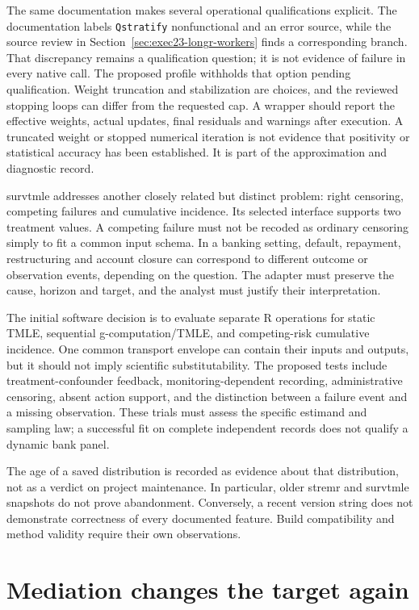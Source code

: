 The same documentation makes several operational qualifications explicit.
The documentation labels \texttt{Qstratify} nonfunctional and an error source,
while the source review in Section~\ref{sec:exec23-longr-workers} finds a
corresponding branch. That discrepancy remains a qualification question;
it is not evidence of failure in every native call. The proposed profile
withholds that option pending qualification. Weight truncation and stabilization
are choices, and the reviewed stopping loops can differ from the requested
cap. A wrapper should report the effective weights, actual updates, final
residuals and warnings after execution. A truncated weight or stopped numerical
iteration is not evidence that positivity or statistical accuracy has been
established. It is part of the approximation and diagnostic record.

survtmle addresses another closely related but distinct problem: right
censoring, competing failures and cumulative incidence. Its selected interface
supports two treatment values. A competing failure must not be recoded as
ordinary censoring simply to fit a common input schema. In a banking setting,
default, repayment, restructuring and account closure can correspond to
different outcome or observation events, depending on the question. The
adapter must preserve the cause, horizon and target, and the analyst must
justify their interpretation. \cite{v12_sw_survtmle}

The initial software decision is to evaluate separate R operations for static
TMLE, sequential g-computation/TMLE, and competing-risk cumulative incidence.
One common transport envelope can contain their inputs and outputs, but it
should not imply scientific substitutability. The proposed tests include
treatment-confounder feedback, monitoring-dependent recording, administrative
censoring, absent action support, and the distinction between a failure event
and a missing observation. These trials must assess the specific estimand and
sampling law; a successful fit on complete independent records does not
qualify a dynamic bank panel.

The age of a saved distribution is recorded as evidence about that distribution,
not as a verdict on project maintenance. In particular, older stremr and
survtmle snapshots do not prove abandonment. Conversely, a recent version
string does not demonstrate correctness of every documented feature. Build
compatibility and method validity require their own observations.

\section{Mediation changes the target again}

